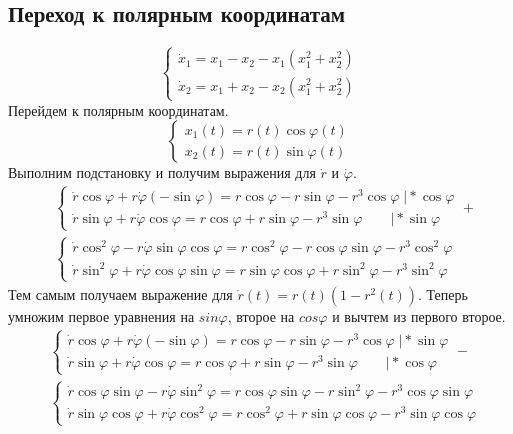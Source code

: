 \subsection{Переход к полярным координатам}
\begin{equation}
\begin{cases}
  \dot{x}_1=x_1-x_2-x_1(x_1^2+x_2^2)\\
  \dot{x}_2=x_1+x_2-x_2(x_1^2+x_2^2)
\end{cases}
\end{equation}
Перейдем к полярным координатам.
\begin{equation}
  \begin{cases}
    x_1(t)=r(t)\cos{\varphi(t)}\\
    x_2(t)=r(t)\sin{\varphi(t)}
  \end{cases}
\end{equation}
Выполним подстановку и получим выражения для $\dot{r}$ и $\dot{\varphi}$.
\begin{align}
  &\begin{cases}
    \dot{r}\cos{\varphi}+r\dot{\varphi}(-\sin{\varphi})=r\cos{\varphi}-r\sin{\varphi}-r^3\cos{\varphi}\;\big|*\cos{\varphi}\\
    \dot{r}\sin{\varphi}+r\dot{\varphi}\cos{\varphi}=r\cos{\varphi}+r\sin{\varphi}-r^3\sin{\varphi}\quad\quad\big|*\sin{\varphi}
  \end{cases}+\\
  &\begin{cases}
    \dot{r}\cos^2{\varphi}-r\dot{\varphi}\sin{\varphi}\cos{\varphi}=
    r\cos^2{\varphi}-r\cos{\varphi}\sin{\varphi}-r^3\cos^2{\varphi}\\
    \dot{r}\sin^2{\varphi}+r\dot{\varphi}\cos{\varphi}\sin{\varphi}=
    r\sin{\varphi}\cos{\varphi}+r\sin^2{\varphi}-r^3\sin^2{\varphi}
  \end{cases}
\end{align}
Тем самым получаем выражение для $\dot{r}(t)=r(t)(1-r^2(t))$. Теперь умножим первое уравнения на $sin{\varphi}$,
второе на $cos{\varphi}$ и вычтем из первого второе.
\begin{align}
  &\begin{cases}
    \dot{r}\cos{\varphi}+r\dot{\varphi}(-\sin{\varphi})=r\cos{\varphi}-r\sin{\varphi}-r^3\cos{\varphi}\;\big|*\sin{\varphi}\\
    \dot{r}\sin{\varphi}+r\dot{\varphi}\cos{\varphi}=r\cos{\varphi}+r\sin{\varphi}-r^3\sin{\varphi}\quad\quad\big|*\cos{\varphi}
  \end{cases}-\\
  &\begin{cases}
    \dot{r}\cos{\varphi}\sin{\varphi}-r\dot{\varphi}\sin^2{\varphi}=
    r\cos{\varphi}\sin{\varphi}-r\sin^2{\varphi}-r^3\cos{\varphi}\sin{\varphi}\\
    \dot{r}\sin{\varphi}\cos{\varphi}+r\dot{\varphi}\cos^2{\varphi}=
    r\cos^2{\varphi}+r\sin{\varphi}\cos{\varphi}-r^3\sin{\varphi}\cos{\varphi}
  \end{cases}
\end{align}
